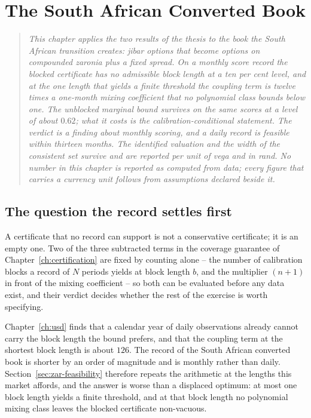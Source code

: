 \documentclass[../../../main.tex]{subfiles}
\begin{document}
\chapter{The South African Converted Book}\label{ch7-zar-coda}\label{ch:zar}

\begin{quote}\itshape
This chapter applies the two results of the thesis to the book the South African transition creates: \gls{jibar} options that become options on compounded \gls{zaronia} plus a fixed spread. On a monthly score record the blocked certificate has no admissible block length at a ten per cent level, and at the one length that yields a finite threshold the coupling term is twelve times a one-month mixing coefficient that no polynomial class bounds below one. The unblocked marginal bound survives on the same scores at a level of about $0.62$; what it costs is the calibration-conditional statement. The verdict is a finding about monthly scoring, and a daily record is feasible within thirteen months. The identified valuation and the width of the consistent set survive and are reported per unit of vega and in rand. No number in this chapter is reported as computed from data; every figure that carries a currency unit follows from assumptions declared beside it.
\end{quote}

\section{The question the record settles first}\label{sec:zar-question}

A certificate that no record can support is not a conservative certificate; it is an empty one. Two of the three subtracted terms in the coverage guarantee of Chapter~\ref{ch:certification} are fixed by counting alone -- the number of calibration blocks a record of $N$ periods yields at block length $b$, and the multiplier $(n+1)$ in front of the mixing coefficient -- so both can be evaluated before any data exist, and their verdict decides whether the rest of the exercise is worth specifying.

Chapter~\ref{ch:usd} finds that a calendar year of daily observations already cannot carry the block length the bound prefers, and that the coupling term at the shortest block length is about $126$. The record of the South African converted book is shorter by an order of magnitude and is monthly rather than daily. Section~\ref{sec:zar-feasibility} therefore repeats the arithmetic at the lengths this market affords, and the answer is worse than a displaced optimum: at most one block length yields a finite threshold, and at that block length no polynomial mixing class leaves the blocked certificate non-vacuous.
\end{document}
